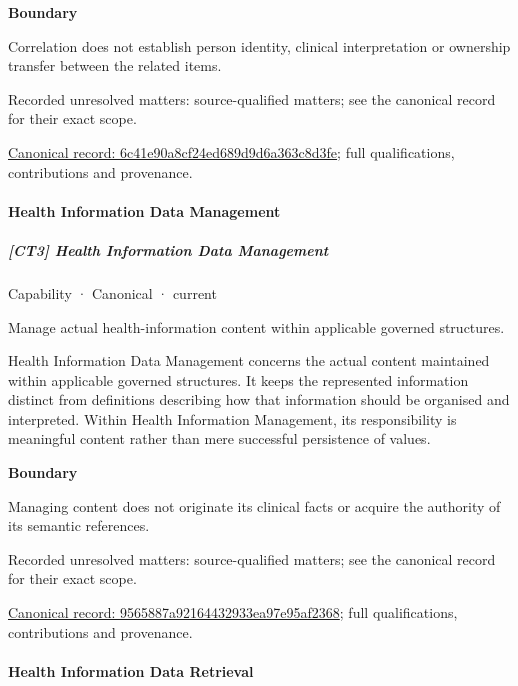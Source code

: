 \textbf{Boundary}



Correlation does not establish person identity, clinical interpretation or ownership transfer between the related items.


{\small Recorded unresolved matters: source-qualified matters; see the canonical record for their exact scope.}\par
{\footnotesize \href{../../../../continuum/strategy/capability/6c41e90a8cf24ed689d9d6a363c8d3fe.md}{Canonical record: 6c41e90a8cf24ed689d9d6a363c8d3fe}; full qualifications, contributions and provenance.}\par
\paragraph{Health Information Data Management}

\subparagraph{[CT3] Health Information Data Management}

\label{element:9565887a92164432933ea97e95af2368}
{\small Capability · Canonical · current}\par

Manage actual health-information content within applicable governed structures.



Health Information Data Management concerns the actual content maintained within applicable governed structures. It keeps the represented information distinct from definitions describing how that information should be organised and interpreted. Within Health Information Management, its responsibility is meaningful content rather than mere successful persistence of values.



\textbf{Boundary}



Managing content does not originate its clinical facts or acquire the authority of its semantic references.


{\small Recorded unresolved matters: source-qualified matters; see the canonical record for their exact scope.}\par
{\footnotesize \href{../../../../continuum/strategy/capability/9565887a92164432933ea97e95af2368.md}{Canonical record: 9565887a92164432933ea97e95af2368}; full qualifications, contributions and provenance.}\par
\paragraph{Health Information Data Retrieval}

